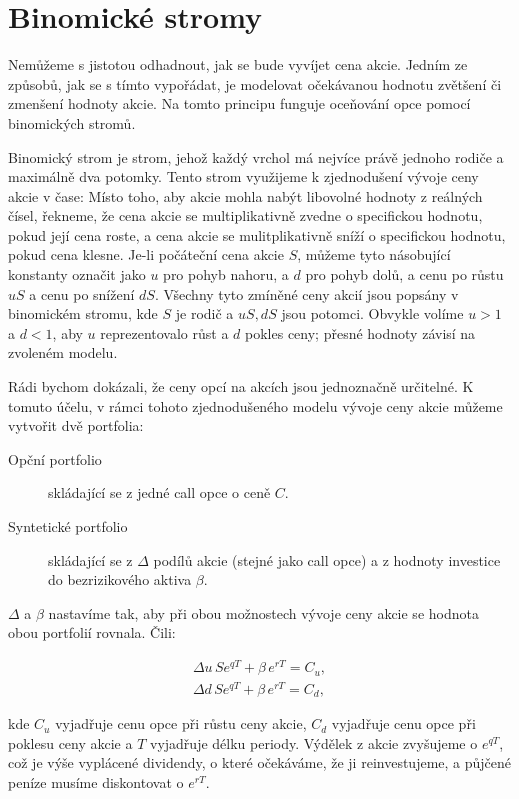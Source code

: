 \documentclass{article}
\begin{document}
\section{Binomické stromy}\label{sec:binom}

Nemůžeme s jistotou odhadnout, jak se bude vyvíjet cena akcie. Jedním ze způsobů, jak se s tímto vypořádat, je modelovat očekávanou hodnotu zvětšení či zmenšení hodnoty akcie. Na tomto principu funguje oceňování opce pomocí binomických stromů.

Binomický strom je strom, jehož každý vrchol má nejvíce právě jednoho rodiče a maximálně dva potomky. %
Tento strom využijeme k zjednodušení vývoje ceny akcie v čase: Místo toho, aby akcie mohla nabýt libovolné hodnoty z reálných čísel, řekneme, že cena akcie se multiplikativně zvedne o specifickou hodnotu, pokud její cena roste, a cena akcie se mulitplikativně sníží o specifickou hodnotu, pokud cena klesne. Je-li počáteční cena akcie $S$, můžeme tyto násobující konstanty označit jako $u$ pro pohyb nahoru, a $d$ pro pohyb dolů, a cenu po růstu $uS$ a cenu po snížení $dS$. Všechny tyto zmíněné ceny akcií jsou popsány v binomickém stromu, kde $S$ je rodič a $uS, dS$ jsou potomci. Obvykle volíme $u > 1$ a $d < 1$, aby $u$ reprezentovalo růst a $d$ pokles ceny; přesné hodnoty závisí na zvoleném modelu. %


Rádi bychom dokázali, že ceny opcí na akcích jsou jednoznačně určitelné. K tomuto účelu, v rámci tohoto zjednodušeného modelu vývoje ceny akcie můžeme vytvořit dvě portfolia: 

\begin{description}
  \item[Opční portfolio] skládající se z jedné call opce o ceně $C$.
  \item[Syntetické portfolio] skládající se z $\Delta$ podílů akcie (stejné jako call opce) a z hodnoty investice do bezrizikového aktiva $\beta$.
\end{description}

$\Delta$ a $\beta$ nastavíme tak, aby při obou možnostech vývoje ceny akcie se hodnota obou portfolií rovnala. Čili:

\begin{gather}
  \Delta u \, S e^{qT} + \beta \, e^{rT} = C_u, \\ 
  \Delta d \, S e^{qT} + \beta \, e^{rT} = C_d,
\end{gather}

kde $C_u$ vyjadřuje cenu opce při růstu ceny akcie, $C_d$ vyjadřuje cenu opce při poklesu ceny akcie a $T$ vyjadřuje délku periody. Výdělek z akcie zvyšujeme o $e^{qT}$, což je výše vyplácené dividendy, o které očekáváme, že ji reinvestujeme, a půjčené peníze musíme diskontovat o $e^{rT}$. \citep{CoxRossRubinstein1979} \citep[Kapitola~13]{McDonald2013}
\end{document}
